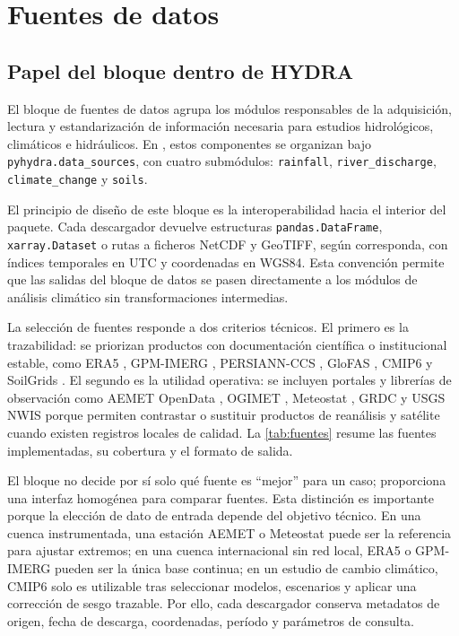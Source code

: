 \chapter{Fuentes de datos}
\label{ch:fuentes_datos}

\section{Papel del bloque dentro de HYDRA}

El bloque de fuentes de datos agrupa los módulos responsables de la adquisición, lectura y estandarización de información necesaria para estudios hidrológicos, climáticos e hidráulicos. En \pyhydra, estos componentes se organizan bajo \texttt{pyhydra.data\_sources}, con cuatro submódulos: \texttt{rainfall}, \texttt{river\_discharge}, \texttt{climate\_change} y \texttt{soils}.

El principio de diseño de este bloque es la interoperabilidad hacia el interior del paquete. Cada descargador devuelve estructuras \texttt{pandas.DataFrame}, \texttt{xarray.Dataset} o rutas a ficheros NetCDF y GeoTIFF, según corresponda, con índices temporales en UTC y coordenadas en WGS84. Esta convención permite que las salidas del bloque de datos se pasen directamente a los módulos de análisis climático sin transformaciones intermedias.

La selección de fuentes responde a dos criterios técnicos. El primero es la trazabilidad: se priorizan productos con documentación científica o institucional estable, como ERA5 \parencite{hersbach2020era5}, GPM-IMERG \parencite{huffman2020gpm}, PERSIANN-CCS \parencite{hong2004persiannccs}, GloFAS \parencite{alfieri2013glofas}, CMIP6 \parencite{eyring2016cmip6,oneill2016ssp} y SoilGrids \parencite{poggio2021soilgrids}. El segundo es la utilidad operativa: se incluyen portales y librerías de observación como AEMET OpenData \parencite{aemetopendata}, OGIMET \parencite{ogimet}, Meteostat \parencite{zippenfenig2023meteostat}, GRDC \parencite{grdcportal} y USGS NWIS \parencite{usgsnwis} porque permiten contrastar o sustituir productos de reanálisis y satélite cuando existen registros locales de calidad. La \cref{tab:fuentes} resume las fuentes implementadas, su cobertura y el formato de salida.

El bloque no decide por sí solo qué fuente es ``mejor'' para un caso; proporciona una interfaz homogénea para comparar fuentes. Esta distinción es importante porque la elección de dato de entrada depende del objetivo técnico. En una cuenca instrumentada, una estación AEMET o Meteostat puede ser la referencia para ajustar extremos; en una cuenca internacional sin red local, ERA5 o GPM-IMERG pueden ser la única base continua; en un estudio de cambio climático, CMIP6 solo es utilizable tras seleccionar modelos, escenarios y aplicar una corrección de sesgo trazable. Por ello, cada descargador conserva metadatos de origen, fecha de descarga, coordenadas, período y parámetros de consulta.

